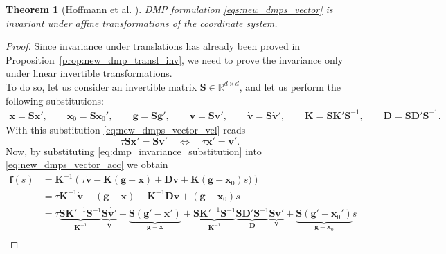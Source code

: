 \documentclass[fleqn, 11pt]{article}
\theoremstyle{definition}
\theoremstyle{plain}
\newtheorem{thm}{Theorem}[section]
\theoremstyle{remark}
\begin{document}
\begin{thm}[Hoffmann et al. \cite{HPPS09}]\label{thm:inv_lin_invariance}
    DMP formulation \eqref{eqs:new_dmps_vector} is invariant under affine transformations of the coordinate system.
\end{thm}
\begin{proof}
    Since invariance under translations has already been proved in Proposition~\ref{prop:new_dmp_transl_inv}, we need to prove the invariance only under linear invertible transformations.\\
    To do so, let us consider an invertible matrix $ \mathbf{S} \in \mathbb{R}^{d \times d} $, and let us perform the following substitutions:
    \begin{equation}
        \begin{gathered}
            \mathbf{x} = \mathbf{S} \mathbf{x} ' , \qquad \mathbf{x}_0 = \mathbf{S} \mathbf{x}_0 ' , \qquad \mathbf{g} = \mathbf{S} \mathbf{g} ' ,\qquad \mathbf{v} = \mathbf{S} \mathbf{v} ' ,\qquad \dot{\mathbf{v}} = \mathbf{S} \dot{\mathbf{v}} ' , \qquad
            \mathbf{K} = \mathbf{S} \mathbf{K} ' \mathbf{S} ^ {-1} , \qquad \mathbf{D} = \mathbf{S} \mathbf{D} ' \mathbf{S} ^ {-1} .
        \end{gathered}
        \label{eq:dmp_invariance_substitution}
    \end{equation}
    With this substitution \eqref{eq:new_dmps_vector_vel} reads
    \[ \tau \mathbf{S} \dot{\mathbf{x}} ' = \mathbf{S}\mathbf{v} ' \quad \Leftrightarrow \quad \tau \dot{\mathbf{x}} ' = \mathbf{v} ' . \]
    Now, by substituting \eqref{eq:dmp_invariance_substitution} into \eqref{eq:new_dmps_vector_acc} we obtain
    \begin{align*}
        \mathbf{f}(s) & = \mathbf{K} ^{-1} \left(  { \tau \dot{\mathbf{v}} - \mathbf{K} ( \mathbf{g} - \mathbf{x} ) + \mathbf{D} \mathbf{v} + \mathbf{K} (\mathbf{g} - \mathbf{x}_0) s ) } \right) \\
            & = \tau \mathbf{K}^{-1} \dot{\mathbf{v}} - ( \mathbf{g} - \mathbf{x} ) + \mathbf{K}^{-1} \mathbf{D} \mathbf{v} + (\mathbf{g} - \mathbf{x}_0) s \\ 
            & = \tau \underbrace{\mathbf{S} \mathbf{K}'^{-1} \mathbf{S}^{-1}}_{\mathbf{K}^{-1}} \underbrace{\mathbf{S} \dot{\mathbf{v}'} }_{\dot{\mathbf{v}}} - \underbrace{\mathbf{S} ( \mathbf{g}' - \mathbf{x} ' ) }_{\mathbf{g} - \mathbf{x}} + \underbrace{\mathbf{S} \mathbf{K}'^{-1} \mathbf{S} ^{-1} }_{\mathbf{K}^{-1}} \underbrace{\mathbf{S} \mathbf{D}' \mathbf{S}^{-1}}_{\mathbf{D}} \underbrace{\mathbf{S} \mathbf{v}'}_{\mathbf{v}} + \underbrace{\mathbf{S} (\mathbf{g}' - \mathbf{x}_0')}_{\mathbf{g} - \mathbf{x}_0}s \\

\end{align*}
\end{proof}
\end{document}
